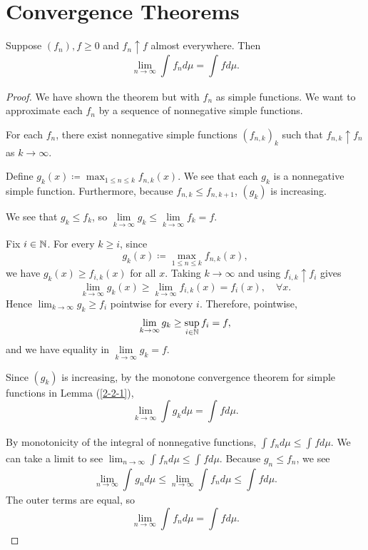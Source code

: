 \section{Convergence Theorems}


\begin{theorem}
	Suppose $(f_n), f \ge 0$ and $f_n \uparrow f$ almost everywhere. Then \[
		\lim\limits_{n \to \infty} \int_{}^{} f_n d\mu = \int_{}^{} fd\mu  
	.\] 
\end{theorem}
\begin{proof}
	We have shown the theorem but with $f_n$ as simple functions. We want to approximate each $f_n$ by a sequence of nonnegative simple functions.

	For each $f_n$, there exist nonnegative simple functions $(f_{n,k})_k$ such that $f_{n,k} \uparrow f_n$ as $k\to \infty$.

	Define $g_k(x) \coloneqq \max_{1 \le n \le k} f_{n,k}(x)$. We see that each $g_k$ is a nonnegative simple function. Furthermore, because $f_{n,k} \le f_{n,k+1}$, $\left( g_k \right)$ is increasing.
	
	We see that $g_k \le f_k$, so $\lim\limits_{k \to \infty} g_k \le \lim\limits_{k \to \infty} f_k = f$.

	Fix $i \in \mathbb{N}$. For every $k \ge i$, since
	\[
		g_k(x) \coloneqq \max_{1 \le n \le k} f_{n,k}(x),
	\]
	we have $g_k(x) \ge f_{i,k}(x)$ for all $x$. Taking $k \to \infty$ and using $f_{i,k} \uparrow f_i$ gives
	\[
		\lim_{k \to \infty} g_k(x) \ge \lim_{k \to \infty} f_{i,k}(x) = f_i(x), \quad \forall x.
	\]
	Hence $\lim_{k\to\infty} g_k \ge f_i$ pointwise for every $i$. Therefore, pointwise,
	\[
		\lim_{k \to \infty} g_k \ge \sup_{i \in \mathbb{N}} f_i = f,
	\] and we have equality in $\lim\limits_{k \to \infty} g_k = f$.

	Since $(g_k)$ is increasing, by the monotone convergence theorem for simple functions in Lemma (\ref{2-2-1}), \[
		\lim\limits_{k \to \infty} \int g_k d\mu = \int_{}^{} fd\mu 
	.\] 

	By monotonicity of the integral of nonnegative functions, $\int_{}^{} f_n d\mu \le \int_{}^{} f d\mu  $. We can take a limit to see $\lim_{n \to \infty} \int_{}^{} f_n d\mu \le \int_{}^{} fd\mu  $. Because $g_n \le f_n$, we see \[
		\lim\limits_{n \to \infty} \int_{}^{} g_n d\mu \le \lim\limits_{n \to \infty} \int_{}^{} f_n d\mu \le \int_{}^{} fd\mu   
	.\] The outer terms are equal, so \[
		\lim\limits_{n \to \infty} \int_{}^{} f_n d\mu = \int_{}^{} fd\mu  
	.\] 
\end{proof}

